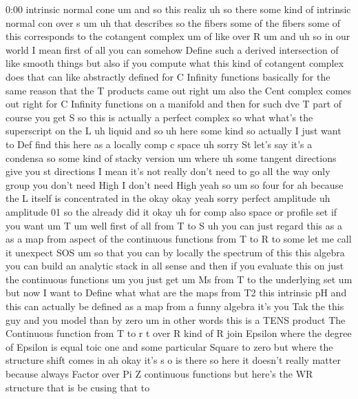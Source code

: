 \begin{unfinished}{0:00}
intrinsic  normal
cone  um  and  so  this  realiz
uh  so  there  some  kind  of  intrinsic
normal  con  over  s
um  uh  that  describes  so  the  fibers  some
of  the
fibers  some  of  this  corresponds  to  the
cotangent
complex
um  of
like  over
R  um  and
uh  so  in  our  world  I  mean  first  of  all
you  can  somehow  Define  such  a  derived
intersection  of  like  smooth  things  but
also  if  you  compute  what  this  kind  of
cotangent  complex  does  that  can  like
abstractly  defined  for  C  Infinity
functions  basically  for  the  same  reason
that  the  T  products  came  out  right  um
also  the  Cent  complex  comes  out  right
for  C  Infinity  functions  on  a  manifold
and  then  for  such  dve  T  part  of  course
you  get  S  so  this  is  actually  a  perfect
complex  so  what  what's  the  superscript
on  the
L  uh
liquid  and  so  uh  here  some
kind  so  actually  I  just  want  to  Def  find
this  here  as  a  locally  comp  c
space  uh  sorry
St  let's  say  it's  a  condensa  so  some
kind  of  stacky
version  um  where  uh  some  tangent
directions  give  you  st
directions
I  mean  it's  not  really  don't  need  to  go
all  the
way  only  group  you  don't  need
High  I  don't  need  High
yeah  so
um  so  four  for  ah  because  the  L  itself
is  concentrated  in  the  okay
okay  yeah  sorry  perfect  amplitude  uh
amplitude
01  so  the  already  did  it
okay  uh  for  comp  also  space  or  profile
set  if  you  want  um  T
um  well  first  of  all  from  T  to
S
uh  you  can  just  regard  this  as  a  as  a
map  from
aspect  of  the  continuous  functions  from
T  to
R  to
some  let  me  call  it  unexpect  SOS  um  so
that  you  can  by  locally  the  spectrum  of
this  this  algebra  you  can  build  an
analytic  stack  in  all  sense  and  then  if
you  evaluate  this  on  just  the  continuous
functions  um  you  just  get  um  Ms  from  T
to  the  underlying  set  um  but  now  I  want
to  Define  what  what  are  the  maps  from  T2
this  intrinsic
pH  and  this  can  actually  be  defined  as  a
map  from  a  funny  algebra  it's  you  Tak
the  this  guy  and  you  model
than  by
zero
um  in  other  words  this  is  a  TENS  product
The  Continuous  function  from  T  to  r  t
over
R  kind  of  R  join  Epsilon  where  the
degree  of  Epsilon  is  equal
toic
one  and  some  particular  Square  to
zero  but  where  the  structure  shift  comes
in  ah  okay  it's  s  o  is
there  so  here  it  doesn't  really  matter
because  always  Factor  over  Pi  Z
continuous  functions  but  here's  the  WR
structure  that  is  be  cusing  that  to

\end{unfinished}
